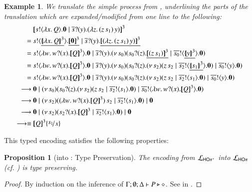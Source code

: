 \documentclass[preprint,11pt]{elsarticle}
\newtheorem{proposition}{Proposition}[section]
\newtheorem{example}{Example}[section]
\begin{document}
{{\begin{example}
We translate the simple process from , underlining the parts of the translation which are expanded/modified from one line to the following:
\begin{align*}
& \map{\bout{s}{\abs{x}{Q}}\inact  \Par \binp{\dual{s}}{y}(\appl{\abs{z}{(\appl{z}{s_1}})}{y})}^{3} 
\\
=~ &
\bout{s}{\underline{\auxmap{\abs{x}{Q}}{3}}}\underline{\map{\inact}^{3}}  \Par \binp{\dual{s}}{y}\underline{\map{(\appl{\abs{z}{(\appl{z}{s_1}})}{y})}^{3}} 
\\
=~ & \bout{s}{\abs{w}{\binp{w}{x} \pmap{Q}{3}}} \inact   \Par \binp{\dual{s}}{y}\newsp{s_0}{\binp{s_0}{z} \underline{\pmap{(\appl{z}{s_1})}{3}} \Par  \bout{\dual{s_0}}{\underline{\auxmap{y}{3}}} \inact}
\\
=~ & \bout{s}{\abs{w}{\binp{w}{x} \pmap{Q}{3}}}\inact  \Par \binp{\dual{s}}{y}\newsp{s_0}{\binp{s_0}{z} \newsp{s_2}{\appl{z}{s_2} \Par \bout{\dual{s_2}}{\underline{\auxmap{s_1}{3}}} \inact} \Par  \bout{\dual{s_0}}{y} \inact}
\\
=~ & \bout{s}{\abs{w}{\binp{w}{x} \pmap{Q}{3}}}\inact  \Par \binp{\dual{s}}{y}\newsp{s_0}{\binp{s_0}{z} \newsp{s_2}{\appl{z}{s_2} \Par \bout{\dual{s_2}}{s_1} \inact} \Par  \bout{\dual{s_0}}{y} \inact}
\\
\red~ & \inact  \Par \newsp{s_0}{\binp{s_0}{z} \newsp{s_2}{\appl{z}{s_2} \Par \bout{\dual{s_2}}{s_1} \inact} \Par  \bout{\dual{s_0}}{\abs{w}{\binp{w}{x} \pmap{Q}{3}}} \inact}
\\
\red~ & \inact  \Par \newsp{s_2}{\appl{(\abs{w}{\binp{w}{x} \pmap{Q}{3}})}{s_2} \Par \bout{\dual{s_2}}{s_1} \inact} \Par \inact
\\
\red~ & \inact  \Par \newsp{s_2}{\binp{s_2}{x} \pmap{Q}{3} \Par \bout{\dual{s_2}}{s_1} \inact} \Par \inact
\\ 
\red\scong~ & \pmap{Q}{3}\subst{s_1}{x}
\end{align*}
\end{example}
This typed encoding satisfies the following properties:
{
\begin{proposition}[\HOpp into \HOp: Type Preservation]
\label{prop:typepres_HOpp_to_HOp}
The encoding from $\mathcal{L}_{\mathsf{HO\pi^{+}}}$ into $\mathcal{L}_{\mathsf{HO}\pi}$ (cf. )
is type preserving.
\end{proposition}}

\begin{proof}
	By induction on the inference of 
	$\Gamma; \emptyset; \Delta \vdash P \triangleright \diamond$.
	See  in .
	\end{proof}
	
}}
\end{document}
